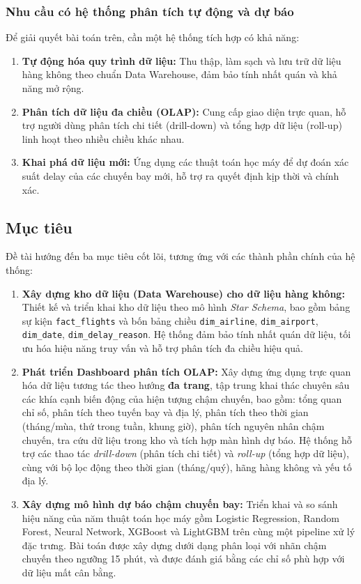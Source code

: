 \subsubsection{Nhu cầu có hệ thống phân tích tự động và dự báo}

Để giải quyết bài toán trên, cần một hệ thống tích hợp có khả năng:
\begin{enumerate}
    \item \textbf{Tự động hóa quy trình dữ liệu:} Thu thập, làm sạch và lưu trữ dữ liệu hàng không theo chuẩn Data Warehouse, đảm bảo tính nhất quán và khả năng mở rộng.
    \item \textbf{Phân tích dữ liệu đa chiều (OLAP):} Cung cấp giao diện trực quan, hỗ trợ người dùng phân tích chi tiết (drill-down) và tổng hợp dữ liệu (roll-up) linh hoạt theo nhiều chiều khác nhau.
    \item \textbf{Khai phá dữ liệu mới:} Ứng dụng các thuật toán học máy để dự đoán xác suất delay của các chuyến bay mới, hỗ trợ ra quyết định kịp thời và chính xác.
\end{enumerate}

\subsection{Mục tiêu}

Đề tài hướng đến ba mục tiêu cốt lõi, tương ứng với các thành phần chính của hệ thống:

\begin{enumerate}
    \item \textbf{Xây dựng kho dữ liệu (Data Warehouse) cho dữ liệu hàng không:}  
    Thiết kế và triển khai kho dữ liệu theo mô hình \textit{Star Schema}, bao gồm bảng sự kiện \texttt{fact\_flights} và bốn bảng chiều
    \texttt{dim\_airline}, \texttt{dim\_airport}, \texttt{dim\_date}, \texttt{dim\_delay\_reason}.
    Hệ thống đảm bảo tính nhất quán dữ liệu, tối ưu hóa hiệu năng truy vấn và hỗ trợ phân tích đa chiều hiệu quả.

    \item \textbf{Phát triển Dashboard phân tích OLAP:}  
    Xây dựng ứng dụng trực quan hóa dữ liệu tương tác theo hướng \textbf{đa trang}, tập trung khai thác chuyên sâu các khía cạnh biến động của hiện tượng chậm chuyến, bao gồm: tổng quan chỉ số, phân tích theo tuyến bay và địa lý, phân tích theo thời gian (tháng/mùa, thứ trong tuần, khung giờ), phân tích nguyên nhân chậm chuyến, tra cứu dữ liệu trong kho và tích hợp màn hình dự báo. Hệ thống hỗ trợ các thao tác \textit{drill-down} (phân tích chi tiết) và \textit{roll-up} (tổng hợp dữ liệu), cùng với bộ lọc động theo thời gian (tháng/quý), hãng hàng không và yếu tố địa lý.

    \item \textbf{Xây dựng mô hình dự báo chậm chuyến bay:}  
    Triển khai và so sánh hiệu năng của năm thuật toán học máy gồm Logistic Regression, Random Forest, Neural Network, XGBoost và LightGBM trên cùng một pipeline xử lý đặc trưng. Bài toán được xây dựng dưới dạng phân loại với nhãn chậm chuyến theo ngưỡng 15 phút, và được đánh giá bằng các chỉ số phù hợp với dữ liệu mất cân bằng.
\end{enumerate}

